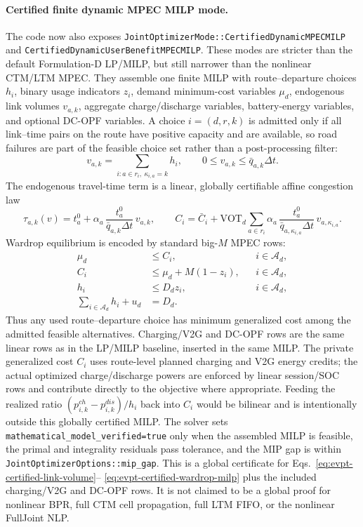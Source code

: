 \paragraph{Certified finite dynamic MPEC MILP mode.}
The code now also exposes
\texttt{JointOptimizerMode::CertifiedDynamicMPECMILP} and
\texttt{CertifiedDynamicUserBenefitMPECMILP}.  These modes are stricter than
the default Formulation-D LP/MILP, but still narrower than the nonlinear
CTM/LTM MPEC.  They assemble one finite MILP with route--departure choices
\(h_i\), binary usage indicators \(z_i\), demand minimum-cost variables
\(\mu_d\), endogenous link volumes \(v_{a,k}\), aggregate charge/discharge
variables, battery-energy variables, and optional DC-OPF variables.  A choice
\(i=(d,r,k)\) is admitted only if all link--time pairs on the route have
positive capacity and are available, so road failures are part of the feasible
choice set rather than a post-processing filter:
\begin{equation}
  v_{a,k}=\sum_{i:a\in r_i,\ \kappa_{i,a}=k} h_i,\qquad
  0\le v_{a,k}\le \bar q_{a,k}\Delta t .
  \label{eq:evpt-certified-link-volume}
\end{equation}
The endogenous travel-time term is a linear, globally certifiable affine
congestion law
\begin{equation}
  \tau_{a,k}(v)=t^0_a+
  \alpha_a\,\frac{t^0_a}{\bar q_{a,k}\Delta t}\,v_{a,k},
  \qquad
  C_i=\bar C_i+
  \mathrm{VOT}_d\sum_{a\in r_i}
  \alpha_a\,\frac{t^0_a}{\bar q_{a,\kappa_{i,a}}\Delta t}\,
  v_{a,\kappa_{i,a}} .
  \label{eq:evpt-certified-affine-cost}
\end{equation}
Wardrop equilibrium is encoded by standard big-\(M\) MPEC rows:
\begin{align}
  \mu_d &\le C_i, && i\in\mathcal A_d,\\
  C_i &\le \mu_d + M(1-z_i), && i\in\mathcal A_d,\\
  h_i &\le D_d z_i, && i\in\mathcal A_d,\\
  \sum_{i\in\mathcal A_d}h_i+u_d &= D_d .
  \label{eq:evpt-certified-wardrop-milp}
\end{align}
Thus any used route--departure choice has minimum generalized cost among the
admitted feasible alternatives.  Charging/V2G and DC-OPF rows are the same
linear rows as in the LP/MILP baseline, inserted in the same MILP.  The
private generalized cost \(C_i\) uses route-level planned charging and V2G
energy credits; the actual optimized charge/discharge powers are enforced by
linear session/SOC rows and contribute directly to the objective where
appropriate.  Feeding the realized ratio
\((p^{ch}_{i,k}-p^{dis}_{i,k})/h_i\) back into \(C_i\) would be bilinear and
is intentionally outside this globally certified MILP.  The solver
sets \texttt{mathematical\_model\_verified=true} only when the assembled MILP
is feasible, the primal and integrality residuals pass tolerance, and the MIP
gap is within \texttt{JointOptimizerOptions::mip\_gap}.  This is a global
certificate for Eqs.~\eqref{eq:evpt-certified-link-volume}--
\eqref{eq:evpt-certified-wardrop-milp} plus the included charging/V2G and
DC-OPF rows.  It is not claimed to be a global proof for nonlinear BPR,
full CTM cell propagation, full LTM FIFO, or the nonlinear FullJoint NLP.

